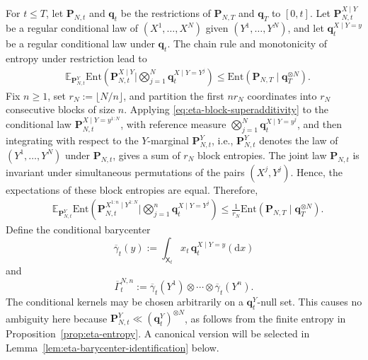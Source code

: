 \documentclass[10pt,a4paper,reqno]{amsart}
\numberwithin{equation}{section}
\theoremstyle{plain}
\theoremstyle{definition}
\theoremstyle{remark}
\renewcommand{\d}{\mathrm d}
\newcommand{\Ent}{\mathrm{Ent}}
\newcommand{\E}{\mathbb E}
\newcommand{\1}{\mathbf 1}
\begin{document}
For \(t\le T\), let \(\mathbf P_{N,t}\) and \(\mathbf q_t\) be the
restrictions of \(\mathbf P_{N,T}\) and \(\mathbf q_T\) to \([0,t]\).
Let \(\mathbf P_{N,t}^{X\mid Y}\) be a regular conditional law of
\((X^1,\ldots,X^N)\) given \((Y^1,\ldots,Y^N)\), and let
\(\mathbf q_t^{X\mid Y=y}\) be a regular conditional law under
\(\mathbf q_t\).  The chain rule and monotonicity of entropy under
restriction lead to
\begin{equation}
\begin{aligned}
  &\E_{\mathbf P_{N,t}^Y}
  \Ent\left(
    \mathbf P_{N,t}^{X\mid Y}
    \mathrel{\bigg|}
    \bigotimes_{j=1}^N
    \mathbf q_t^{X\mid Y=Y^j}
  \right)\le
  \Ent\left(
    \mathbf P_{N,T}
    \mid
    \mathbf q_T^{\otimes N}
  \right).
\end{aligned}
  \label{eq:eta-total-conditional-entropy}
\end{equation}
Fix \(n\ge1\), set \(r_N:=\lfloor N/n\rfloor\), and partition the first \(nr_N\) coordinates into \(r_N\) consecutive blocks of size \(n\).  Applying \eqref{eq:eta-block-superadditivity} to the conditional law \(\mathbf P_{N,t}^{X\mid Y=y^{1:N}}\), with reference measure \(\bigotimes_{j=1}^N\mathbf q_t^{X\mid Y=y^j}\), and then integrating with respect to the \(Y\)-marginal \(\mathbf P_{N,t}^Y\),  i.e.,  \(\mathbf P_{N,t}^Y\) denotes the law of \((Y^1,\ldots,Y^N)\) under \(\mathbf P_{N,t}\),  gives a sum of \(r_N\) block entropies.  The joint law \(\mathbf P_{N,t}\) is invariant under simultaneous permutations of the pairs \((X^j,Y^j)\).  Hence,  the expectations of these block entropies are equal.  Therefore,
\begin{equation}
\begin{aligned}
  &\E_{\mathbf P_{N,t}^Y}
  \Ent\left(
    \mathbf P_{N,t}^{X^{1:n}\mid Y^{1:N}}
    \mathrel{\bigg|}
    \bigotimes_{j=1}^n
    \mathbf q_t^{X\mid Y=Y^j}
  \right) \le
  \frac1{r_N}
  \Ent\left(
    \mathbf P_{N,T}
    \mid
    \mathbf q_T^{\otimes N}
  \right).
\end{aligned}
  \label{eq:eta-block-conditional-entropy}
\end{equation}
Define the conditional barycenter
\begin{equation}
  \overline\gamma_t(y)
  :=
  \int_{\mathsf X_t}
  x_t\,
  \mathbf q_t^{X\mid Y=y}(\d x)
  \label{eq:eta-bar-gamma-barycenter}
\end{equation}
and
\begin{equation}
  \overline\Gamma_t^{N,n}
  :=
  \overline\gamma_t(Y^1)
  \otimes\cdots\otimes
  \overline\gamma_t(Y^n).
  \label{eq:eta-bar-Gamma-def}
\end{equation}
The conditional kernels may be chosen arbitrarily on a
\(\mathbf q_t^Y\)-null set.  This causes no ambiguity here because
\(\mathbf P_{N,t}^Y\ll(\mathbf q_t^Y)^{\otimes N}\), as follows from the
finite entropy in Proposition~\ref{prop:eta-entropy}.  A canonical version
will be selected in Lemma~\ref{lem:eta-barycenter-identification} below.
\end{document}
